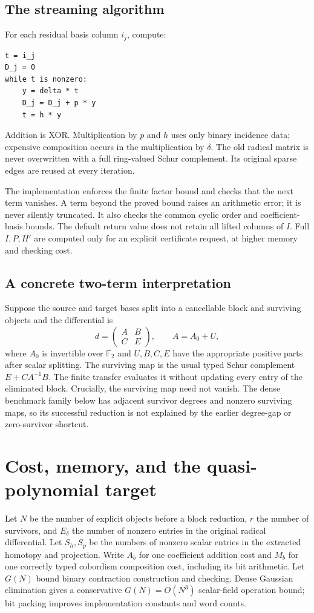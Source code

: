 \documentclass[11pt]{article}
\theoremstyle{definition}\newtheorem{definition}[theorem]{Definition}
\theoremstyle{remark}\newtheorem{remark}[theorem]{Remark}
\newcommand{\F}{{\mathbb F_2}}
\begin{document}
\subsection{The streaming algorithm}
For each residual basis column $i_j$, compute:
\begin{lstlisting}
t = i_j
D_j = 0
while t is nonzero:
    y = delta * t
    D_j = D_j + p * y
    t = h * y
\end{lstlisting}
Addition is XOR. Multiplication by $p$ and $h$ uses only binary incidence data;
expensive composition occurs in the multiplication by $\delta$. The old radical
matrix is never overwritten with a full ring-valued Schur complement. Its original
sparse edges are reused at every iteration.

The implementation enforces the finite factor bound and checks that the next
term vanishes. A term beyond the proved bound raises an arithmetic error;
it is never silently truncated. It also checks the common cyclic order and
coefficient-basis bounds. The default return value does not retain all lifted
columns of $I$. Full $I,P,H'$ are computed only for an explicit certificate
request, at higher memory and checking cost.

\subsection{A concrete two-term interpretation}
Suppose the source and target bases split into a cancellable block and surviving
objects and the differential is
\[
 d=\begin{pmatrix}A&B\\ C&E\end{pmatrix},\qquad
 A=A_0+U,
\]
where $A_0$ is invertible over $\F$ and $U,B,C,E$ have the appropriate positive
parts after scalar splitting. The surviving map is the usual typed Schur
complement $E+CA^{-1}B$. The finite transfer evaluates it without updating every
entry of the eliminated block. Crucially, the surviving map need not vanish.
The dense benchmark family below has adjacent survivor degrees and nonzero
surviving maps, so its successful reduction is not explained by the earlier
degree-gap or zero-survivor shortcut.

\section{Cost, memory, and the quasi-polynomial target}
\label{sec:cost}
Let $N$ be the number of explicit objects before a block reduction, $r$ the
number of survivors, and $E_\delta$ the number of nonzero entries in the original
radical differential. Let $S_h,S_p$ be the numbers of nonzero scalar entries in
the extracted homotopy and projection. Write $A_b$ for one coefficient addition
cost and $M_b$ for one correctly typed cobordism composition cost, including
its bit arithmetic. Let $G(N)$ bound binary contraction construction and checking.
Dense Gaussian elimination gives a conservative $G(N)=O(N^3)$ scalar-field
operation bound; bit packing improves implementation constants and word counts.
\end{document}
